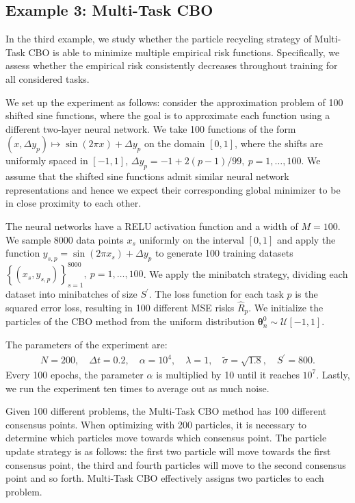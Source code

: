 \documentclass[a4paper, 11pt]{article}
\theoremstyle{plain} %
\begin{document}
	\subsection{Example 3: Multi-Task CBO}
	In the third example, we study whether the particle recycling strategy of Multi-Task CBO is able to \mbox{minimize} multiple empirical risk functions. Specifically, we assess whether the empirical risk consistently decreases throughout training for all considered tasks.
	
	We set up the experiment as follows: consider the approximation problem of 100 shifted sine functions, where the goal is to approximate each function using a different two-layer neural network. We take 100 functions of the form $(x,\Delta y_{p}) \mapsto \sin(2\pi x) + \Delta y_{p} $ on the domain $[0,1]$, where the shifts are uniformly spaced in $[-1,1]$, $ \Delta y_{p} = -1 + 2(p-1)/99,~p=1, \dots, 100 $. We assume that the shifted sine functions admit similar neural network representations and hence we expect their corresponding global minimizer to be in close proximity to each other.
	
	The neural networks have a RELU activation function and a width of $ M = 100 $. We sample 8000 data points $ x_{s} $ uniformly on the interval $[0,1]$ and apply the function $ y_{s, p} = \sin(2\pi x_{s}) + \Delta y_{p}$ to generate 100 training datasets $\left\{\left( x_{s}, y_{s, p} \right)\right\}_{s=1}^{8000},~p=1, \dots, 100$. We apply the minibatch strategy, dividing each dataset into minibatches of size $ S^\prime $. The loss function for each task $p$ is the squared error loss, resulting in 100 different MSE risks $ \hat{R}_{p} $. We initialize the particles of the CBO method from the uniform distribution $ \bm{\theta}^{0}_{n} \sim \mathcal{U}[-1,1] $. 
	
	The parameters of the experiment are:
	\begin{align*}
		N = 200, \quad \Delta t = 0.2, \quad \alpha = 10^4, \quad \lambda = 1, \quad \tilde{\sigma} = \sqrt{1.8}, \quad S^\prime = 800.
	\end{align*}
	Every 100 epochs, the parameter $ \alpha $ is multiplied by 10 until it reaches $ 10^7 $. Lastly, we run the experiment ten times to average out as much noise.

	Given 100 different problems, the Multi-Task CBO method has 100 different consensus points. When optimizing with 200 particles, it is necessary to determine which particles move towards which consensus point. The particle update strategy is as follows: the first two particle will move towards the first consensus point, the third and fourth particles will move to the second consensus point and so forth. Multi-Task CBO effectively assigns two particles to each problem.
	  
\end{document}
